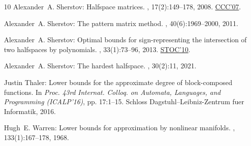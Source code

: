 \begin{thebibliography}{10}
{\sc Alexander~A. Sherstov}: Halfspace matrices.
, 17(2):149--178, 2008.
\newblock \prelim \href{https://doi.org/10.1109/CCC.2007.11}{CCC'07}.
\newblock [\epfmtdoi{10.1007/s00037-008-0242-4}]

{\sc Alexander~A. Sherstov}: The pattern matrix method.
, 40(6):1969--2000, 2011.

{\sc Alexander~A. Sherstov}: Optimal bounds for sign-representing the
  intersection of two halfspaces by polynomials.
, 33(1):73--96, 2013.
\newblock \prelim \href{https://doi.org/10.1145/1806689.1806762}{STOC'10}.

{\sc Alexander~A. Sherstov}: The hardest halfspace.
, 30(2):11, 2021.

{\sc Justin Thaler}: Lower bounds for the approximate degree of block-composed
  functions.
\newblock In {\em Proc. 43rd Internat. Colloq. on Automata, Languages, and
  Programming (ICALP'16)}, pp. 17:1--15. Schloss Dagstuhl--Leibniz-Zentrum fuer
  Informatik, 2016.

{\sc Hugh~E. Warren}: Lower bounds for approximation by nonlinear manifolds.
, 133(1):167--178, 1968.
\newblock [\epfmtdoi{10.1090/S0002-9947-1968-0226281-1}]

\end{thebibliography}